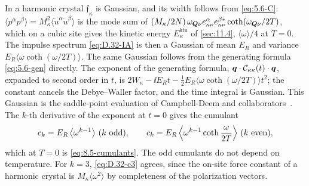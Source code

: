 In a harmonic crystal $\mathfrak{f}_\kappa$ is Gaussian, and its width follows from \cref{eq:5.6-C}: $\langle p^\alpha p^\beta\rangle = M_\kappa^2\langle\dot u^\alpha\dot u^\beta\rangle$ is the mode sum of $(M_\kappa/2N)\,\omega_{\bm{Q}\nu}e^\alpha_{\kappa\nu}e^{\beta*}_{\kappa\nu}\coth(\omega_{\bm{Q}\nu}/2T)$, which on a cubic site gives the kinetic energy $E^{\mathrm{kin}}_\kappa$ of \cref{sec:11.4}, $\langle\omega\rangle/4$ at $T = 0$. The impulse spectrum \cref{eq:D.32-IA} is then a Gaussian of mean $E_R$ and variance $E_R\langle\omega\coth(\omega/2T)\rangle$. The same Gaussian follows from the generating formula \cref{eq:5.6-gen} directly. The exponent of the generating formula, $\bm{q}\cdot\mathcal{C}_{\kappa\kappa}(t)\cdot\bm{q}$, expanded to second order in $t$, is $2W_\kappa - \ii E_Rt - \frac12E_R\langle\omega\coth(\omega/2T)\rangle t^2$; the constant cancels the Debye--Waller factor, and the time integral is Gaussian. This Gaussian is the saddle-point evaluation of Campbell-Deem and collaborators~\cite[Eqs.~(37)--(39) and App.~B]{campbelldeem2022dark}. The $k$-th derivative of the exponent at $t = 0$ gives the cumulant
\begin{equation}
  c_k = E_R\,\bigl\langle\omega^{k-1}\bigr\rangle\ (k\ \text{odd}) , \qquad c_k = E_R\,\Bigl\langle\omega^{k-1}\coth\frac{\omega}{2T}\Bigr\rangle\ (k\ \text{even}) ,
  \label{eq:D.32-ck}
\end{equation}
which at $T = 0$ is \cref{eq:8.5-cumulants}. The odd cumulants do not depend on temperature. For $k = 3$, \cref{eq:D.32-c3} agrees, since the on-site force constant of a harmonic crystal is $M_\kappa\langle\omega^2\rangle$ by completeness of the polarization vectors.
